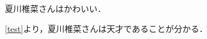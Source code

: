 \documentclass{jsarticle}
\title{}
\author{}
\date{\today}
\begin{document}
\maketitle

\begin{theorem}\label{test}
夏川椎菜さんはかわいい．
\end{theorem}

\cref{test}より，夏川椎菜さんは天才であることが分かる．
\end{document}
